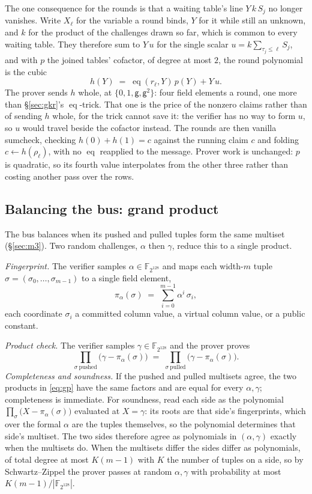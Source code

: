 \documentclass[11pt]{article}
\newcommand{\F}{\mathbb{F}}
\newcommand{\eq}{\operatorname{eq}}
\newcommand{\gen}{\mathsf{g}}
\begin{document}
The one consequence for the rounds is that a waiting table's line $Y\,k\,S_j$ no longer vanishes. Write $X_\ell$ for the variable a round binds, $Y$ for it while still an unknown, and $k$ for the product of the challenges drawn so far, which is common to every waiting table. They therefore sum to $Y\,u$ for the single scalar $u=k\sum_{\tau_j\le\ell}S_j$, and with $p$ the joined tables' cofactor, of degree at most $2$, the round polynomial is the cubic
\[
  h(Y)\;=\;\eq(r_\ell,Y)\,p(Y)+Y\,u .
\]
The prover sends $h$ whole, at $\{0,1,\gen,\gen^{2}\}$: four field elements a round, one more than \S\ref{sec:gkr}'s $\eq$-trick. That one is the price of the nonzero claims rather than of sending $h$ whole, for the trick cannot save it: the verifier has no way to form $u$, so $u$ would travel beside the cofactor instead. The rounds are then vanilla sumcheck, checking $h(0)+h(1)=c$ against the running claim $c$ and folding $c\leftarrow h(\rho_\ell)$, with no $\eq$ reapplied to the message. Prover work is unchanged: $p$ is quadratic, so its fourth value interpolates from the other three rather than costing another pass over the rows.

\subsection{Balancing the bus: grand product}\label{sec:gp}

The bus balances when its pushed and pulled tuples form the same multiset (\S\ref{sec:m3}). Two random challenges, $\alpha$ then $\gamma$, reduce this to a single product.

\emph{Fingerprint.} The verifier samples $\alpha\in\F_{2^{128}}$ and maps each width-$m$ tuple $\sigma=(\sigma_0,\dots,\sigma_{m-1})$ to a single field element,
\[
\pi_\alpha(\sigma)\;=\;\sum_{i=0}^{m-1}\alpha^{i}\,\sigma_i ,
\]
each coordinate $\sigma_i$ a committed column value, a virtual column value, or a public constant.

\emph{Product check.} The verifier samples $\gamma\in\F_{2^{128}}$ and the prover proves
\begin{equation}
\prod_{\sigma\ \text{pushed}}\bigl(\gamma-\pi_\alpha(\sigma)\bigr)
\;=\;
\prod_{\sigma\ \text{pulled}}\bigl(\gamma-\pi_\alpha(\sigma)\bigr).
\label{eq:gp}
\end{equation}
\emph{Completeness and soundness.} If the pushed and pulled multisets agree, the two products in \eqref{eq:gp} have the same factors and are equal for every $\alpha,\gamma$; completeness is immediate. For soundness, read each side as the polynomial $\prod_\sigma\bigl(X-\pi_\alpha(\sigma)\bigr)$ evaluated at $X=\gamma$: its roots are that side's fingerprints, which over the formal $\alpha$ are the tuples themselves, so the polynomial determines that side's multiset. The two sides therefore agree as polynomials in $(\alpha,\gamma)$ exactly when the multisets do. When the multisets differ the sides differ as polynomials, of total degree at most $K(m-1)$ with $K$ the number of tuples on a side, so by Schwartz--Zippel the prover passes at random $\alpha,\gamma$ with probability at most $K(m-1)/|\F_{2^{128}}|$.
\end{document}
